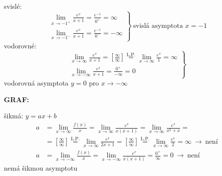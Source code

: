 \documentclass[11pt,a4paper]{article}
\begin{document}
\begin{minipage}{0.6\textwidth}
svislé:
\[
\left.\begin{array}{l}
\displaystyle\lim_{x\to-1^+}\frac{e^x}{x+1} = \frac{e^{-1}}{0^+} = \infty\\[10pt]
\displaystyle\lim_{x\to-1^-}\frac{e^x}{x+1} = \frac{e^{-1}}{0^-} = -\infty
\end{array}\right\}\ \text{svislá asymptota } x=-1
\]
vodorovné:
\[
\left.\begin{array}{l}
\displaystyle\lim_{x\to\infty}\frac{e^x}{x+1} = \left[\frac\infty\infty\right] \overset{\text{L.P.}}{=} \lim_{x\to\infty}\frac{e^x}{1} = \infty\\[10pt]
\displaystyle\lim_{x\to-\infty}\frac{e^x}{x+1} = \frac{0^+}{-\infty} = 0
\end{array}\right\}
\]
vodorovná asymptota $y=0$ pro $x\to-\infty$
\end{minipage}%
\begin{minipage}{0.4\textwidth}
\textbf{GRAF:}\\
\end{minipage}

šikmá: $y=ax+b$
\begin{align*}
a &= \lim_{x\to\infty}\frac{f(x)}{x} = \lim_{x\to\infty}\frac{e^x}{x(x+1)} = \lim_{x\to\infty}\frac{e^x}{x^2+x}
=\\ &= \left[\frac\infty\infty\right] \overset{\text{L.P.}}{=} \lim_{x\to\infty}\frac{e^x}{2x+1} = \left[\frac\infty\infty\right]
\overset{\text{L.P.}}{=} \lim_{x\to\infty}\frac{e^x}{2} = \infty \ \longrightarrow\ \text{není}\\
a &= \lim_{x\to-\infty}\frac{f(x)}{x} = \lim_{x\to-\infty}\frac{e^x}{x(x+1)} = \frac{0^+}{\infty} = 0 \ \longrightarrow\ \text{není}
\end{align*}
nemá šikmou asymptotu
\end{document}
